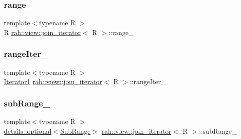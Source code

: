 \subsubsection{\texorpdfstring{range\_}{range\_}}
{\footnotesize\ttfamily template$<$typename R $>$ \\
R \mbox{\hyperlink{structrah_1_1view_1_1join__iterator}{rah\+::view\+::join\+\_\+iterator}}$<$ R $>$\+::range\+\_\+}

\mbox{\label{structrah_1_1view_1_1join__iterator_a754b7bdee5ca2b23868a402c2c3cfcc2}} 
\subsubsection{\texorpdfstring{rangeIter\_}{rangeIter\_}}
{\footnotesize\ttfamily template$<$typename R $>$ \\
\mbox{\hyperlink{structrah_1_1view_1_1join__iterator_a8b71c6f25eee2915e2a8afc6e024196d}{Iterator1}} \mbox{\hyperlink{structrah_1_1view_1_1join__iterator}{rah\+::view\+::join\+\_\+iterator}}$<$ R $>$\+::range\+Iter\+\_\+}

\mbox{\label{structrah_1_1view_1_1join__iterator_ae9351284af0f64c368606315da0b56a5}} 
\subsubsection{\texorpdfstring{subRange\_}{subRange\_}\hspace{0.1cm}{\footnotesize\ttfamily [1/2]}}
{\footnotesize\ttfamily template$<$typename R $>$ \\
\mbox{\hyperlink{structrah_1_1view_1_1details_1_1optional}{details\+::optional}}$<$\mbox{\hyperlink{structrah_1_1view_1_1join__iterator_1_1_sub_range}{Sub\+Range}}$>$ \mbox{\hyperlink{structrah_1_1view_1_1join__iterator}{rah\+::view\+::join\+\_\+iterator}}$<$ R $>$\+::sub\+Range\+\_\+}

\mbox{\label{structrah_1_1view_1_1join__iterator_ac4ca6ff3a0816533a5aa0cd49dbb630d}} 
